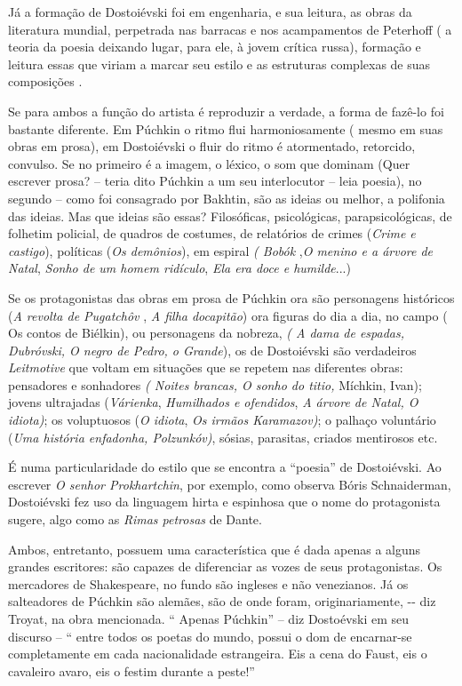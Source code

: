 Já a formação de Dostoiévski foi em engenharia, e sua leitura, as obras
da literatura mundial, perpetrada nas barracas e nos acampamentos de
Peterhoff ( a teoria da poesia deixando lugar, para ele, à jovem crítica
russa), formação e leitura essas que viriam a marcar seu estilo e as
estruturas complexas de suas composições .

Se para ambos a função do artista é reproduzir a verdade, a forma de
fazê-lo foi bastante diferente. Em Púchkin o ritmo flui harmoniosamente
( mesmo em suas obras em prosa), em Dostoiévski o fluir do ritmo é
atormentado, retorcido, convulso. Se no primeiro é a imagem, o léxico, o
som que dominam (Quer escrever prosa? -- teria dito Púchkin a um seu
interlocutor -- leia poesia), no segundo -- como foi consagrado por
Bakhtin, são as ideias ou melhor, a polifonia das ideias. Mas que ideias
são essas? Filosóficas, psicológicas, parapsicológicas, de folhetim
policial, de quadros de costumes, de relatórios de crimes (\emph{Crime e
castigo}), políticas (\emph{Os demônios}), em espiral \emph{( Bobók}
,\emph{O menino e a árvore de Natal}, \emph{Sonho de um homem ridículo},
\emph{Ela era doce e humilde}...)

Se os protagonistas das obras em prosa de Púchkin ora são personagens
históricos (\emph{A revolta de Pugatchôv} , \emph{A filha docapitão})
ora figuras do dia a dia, no campo ( Os contos de Biélkin), ou
personagens da nobreza, \emph{( A dama de espadas, Dubróvski, O negro de
Pedro, o Grande}), os de Dostoiévski são verdadeiros \emph{Leitmotive}
que voltam em situações que se repetem nas diferentes obras: pensadores
e sonhadores \emph{( Noites brancas, O sonho do titio,} Míchkin, Ivan);
jovens ultrajadas (\emph{Várienka}, \emph{Humilhados e ofendidos},
\emph{A árvore de Natal, O idiota)}; os voluptuosos (\emph{O idiota},
\emph{Os irmãos Karamazov)}; o palhaço voluntário (\emph{Uma história
enfadonha, Polzunkóv)}, sósias, parasitas, criados mentirosos etc.

É numa particularidade do estilo que se encontra a ``poesia'' de
Dostoiévski. Ao escrever \emph{O senhor Prokhartchin}, por exemplo, como
observa Bóris Schnaiderman, Dostoiévski fez uso da linguagem hirta e
espinhosa que o nome do protagonista sugere, algo como as \emph{Rimas
petrosas} de Dante.

Ambos, entretanto, possuem uma característica que é dada apenas a alguns
grandes escritores: são capazes de diferenciar as vozes de seus
protagonistas. Os mercadores de Shakespeare, no fundo são ingleses e não
venezianos. Já os salteadores de Púchkin são alemães, são de onde foram,
originariamente, -\/- diz Troyat, na obra mencionada. `` Apenas
Púchkin'' -- diz Dostoévski em seu discurso -- `` entre todos os poetas
do mundo, possui o dom de encarnar-se completamente em cada
nacionalidade estrangeira. Eis a cena do Faust, eis o cavaleiro avaro,
eis o festim durante a peste!''


